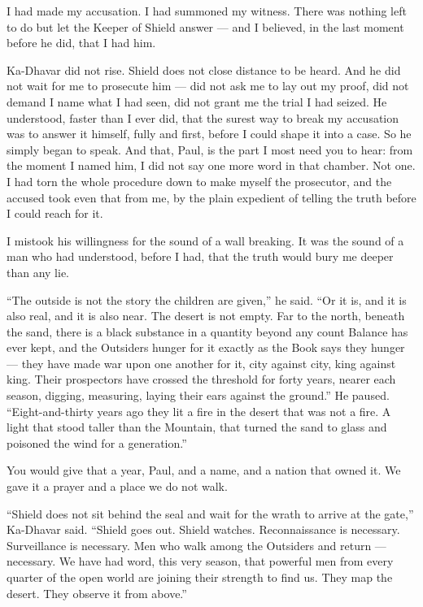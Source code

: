 I had made my accusation. I had summoned my witness. There was nothing left to do but let the Keeper of Shield answer — and I believed, in the last moment before he did, that I had him.\par
 
\ornament
 
Ka-Dhavar did not rise. Shield does not close distance to be heard. And he did not wait for me to prosecute him — did not ask me to lay out my proof, did not demand I name what I had seen, did not grant me the trial I had seized. He understood, faster than I ever did, that the surest way to break my accusation was to answer it himself, fully and first, before I could shape it into a case. So he simply began to speak. And that, Paul, is the part I most need you to hear: from the moment I named him, I did not say one more word in that chamber. Not one. I had torn the whole procedure down to make myself the prosecutor, and the accused took even that from me, by the plain expedient of telling the truth before I could reach for it.\par
 
I mistook his willingness for the sound of a wall breaking. It was the sound of a man who had understood, before I had, that the truth would bury me deeper than any lie.\par
 
``The outside is not the story the children are given,'' he said. ``Or it is, and it is also real, and it is also near. The desert is not empty. Far to the north, beneath the sand, there is a black substance in a quantity beyond any count Balance has ever kept, and the Outsiders hunger for it exactly as the Book says they hunger — they have made war upon one another for it, city against city, king against king. Their prospectors have crossed the threshold for forty years, nearer each season, digging, measuring, laying their ears against the ground.'' He paused. ``Eight-and-thirty years ago they lit a fire in the desert that was not a fire. A light that stood taller than the Mountain, that turned the sand to glass and poisoned the wind for a generation.''\par
 
You would give that a year, Paul, and a name, and a nation that owned it. We gave it a prayer and a place we do not walk.\par
 
``Shield does not sit behind the seal and wait for the wrath to arrive at the gate,'' Ka-Dhavar said. ``Shield goes out. Shield watches. Reconnaissance is necessary. Surveillance is necessary. Men who walk among the Outsiders and return — necessary. We have had word, this very season, that powerful men from every quarter of the open world are joining their strength to find us. They map the desert. They observe it from above.''\par
 
